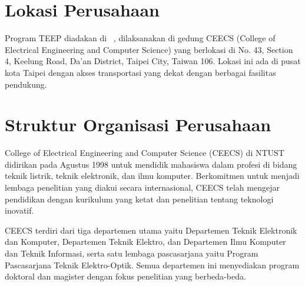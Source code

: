 \section{Lokasi Perusahaan}

Program TEEP diadakan di \namaUniv \ , dilaksanakan di gedung CEECS (College of Electrical Engineering and Computer Science) yang berlokasi di No. 43, Section 4, Keelung Road, Da'an District, Taipei City, Taiwan 106. Lokasi ini ada di pusat kota Taipei dengan akses transportasi yang dekat dengan berbagai fasilitas pendukung.



\section{Struktur Organisasi Perusahaan}

College of Electrical Engineering and Computer Science (CEECS) di NTUST didirikan pada Agustus 1998 untuk mendidik mahasiswa dalam profesi di bidang teknik listrik, teknik elektronik, dan ilmu komputer. Berkomitmen untuk menjadi lembaga penelitian yang diakui secara internasional, CEECS telah mengejar pendidikan dengan kurikulum yang ketat dan penelitian tentang teknologi inovatif.

CEECS terdiri dari tiga departemen utama yaitu Departemen Teknik Elektronik dan Komputer, Departemen Teknik Elektro, dan Departemen Ilmu Komputer dan Teknik Informasi, serta satu lembaga pascasarjana yaitu Program Pascasarjana Teknik Elektro-Optik. Semua departemen ini menyediakan program doktoral dan magister dengan fokus penelitian yang berbeda-beda.



